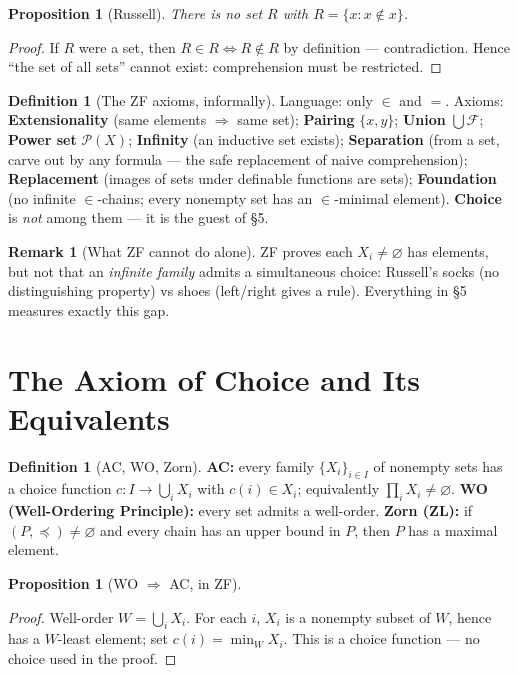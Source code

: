 \documentclass[11pt,a4paper]{article}
\newtheorem{proposition}[theorem]{Proposition}
\theoremstyle{definition}
\newtheorem{definition}[theorem]{Definition}
\newtheorem{remark}[theorem]{Remark}
\newcommand{\Pow}{\mathcal{P}}
\begin{document}
\begin{proposition}[Russell]
There is no set $R$ with $R=\{x:x\notin x\}$.
\end{proposition}
\begin{proof}
If $R$ were a set, then $R\in R\iff R\notin R$ by definition --- contradiction. Hence
``the set of all sets'' cannot exist: comprehension must be restricted.
\end{proof}

\begin{definition}[The ZF axioms, informally]
Language: only $\in$ and $=$. Axioms: \textbf{Extensionality} (same elements $\Rightarrow$ same set);
\textbf{Pairing} $\{x,y\}$; \textbf{Union} $\bigcup\mathcal F$; \textbf{Power set} $\Pow(X)$;
\textbf{Infinity} (an inductive set exists); \textbf{Separation} (from a set, carve out by any
formula --- the safe replacement of naive comprehension); \textbf{Replacement} (images of sets under
definable functions are sets); \textbf{Foundation} (no infinite $\in$-chains; every nonempty set has
an $\in$-minimal element). \textbf{Choice} is \emph{not} among them --- it is the guest of \S5.
\end{definition}

\begin{remark}[What ZF cannot do alone]
ZF proves each $X_i\neq\varnothing$ has elements, but not that an \emph{infinite family} admits a
simultaneous choice: Russell's socks (no distinguishing property) vs shoes (left/right gives a rule).
Everything in \S5 measures exactly this gap.
\end{remark}

\section{The Axiom of Choice and Its Equivalents}

\begin{definition}[AC, WO, Zorn]
\textbf{AC:} every family $\{X_i\}_{i\in I}$ of nonempty sets has a choice function
$c:I\to\bigcup_i X_i$ with $c(i)\in X_i$; equivalently $\prod_i X_i\neq\varnothing$.
\textbf{WO (Well-Ordering Principle):} every set admits a well-order.
\textbf{Zorn (ZL):} if $(P,\preceq)\neq\varnothing$ and every chain has an upper bound in $P$, then
$P$ has a maximal element.
\end{definition}

\begin{proposition}[WO $\Rightarrow$ AC, in ZF]\label{prop:wo-ac}
\end{proposition}
\begin{proof}
Well-order $W=\bigcup_i X_i$. For each $i$, $X_i$ is a nonempty subset of $W$, hence has a
$W$-least element; set $c(i)=\min_W X_i$. This is a choice function --- no choice used in the proof.
\end{proof}
\end{document}
